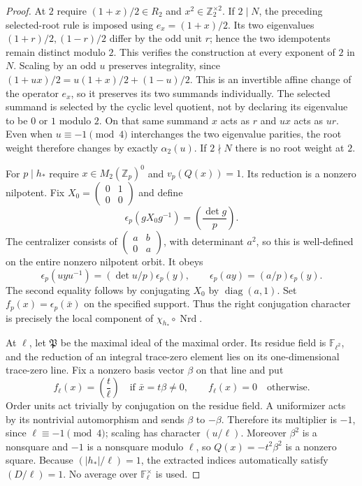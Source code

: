 \begin{proof}
At $2$ require $(1+x)/2\in R_2$ and $x^2\in\mathbb Z_2^{\times2}$.
If $2\mid N$, the preceding selected-root rule is imposed using
$e_x=(1+x)/2$.  Its two eigenvalues $(1+r)/2,(1-r)/2$ differ by the
odd unit $r$; hence the two idempotents remain distinct modulo $2$.
This verifies the construction at every exponent of $2$ in $N$.
Scaling by an odd $u$ preserves integrality, since
$(1+ux)/2=u(1+x)/2+(1-u)/2$.  This is an invertible affine change of
the operator $e_x$, so it preserves its two summands individually.
The selected summand is selected by the cyclic level quotient, not
by declaring its eigenvalue to be $0$ or $1$ modulo $2$.  On that same
summand $x$ acts as $r$ and $ux$ acts as $ur$.  Even when
$u\equiv-1\pmod4$ interchanges the two eigenvalue parities, the root
weight therefore changes by exactly $\alpha_2(u)$.
If $2\nmid N$ there is no root weight at $2$.

For $p\mid h_*$ require $x\in M_2(\mathbb Z_p)^0$ and
$v_p(Q(x))=1$.  Its reduction is a nonzero nilpotent.  Fix
$X_0=\left(\begin{smallmatrix}0&1\\0&0\end{smallmatrix}\right)$ and
define
\[
 \epsilon_p(gX_0g^{-1})=\left(\frac{\det g}{p}\right).
\]
The centralizer consists of
$\left(\begin{smallmatrix}a&b\\0&a\end{smallmatrix}\right)$, with
determinant $a^2$, so this is well-defined on the entire nonzero
nilpotent orbit.  It obeys
\[
 \epsilon_p(uyu^{-1})=(\det u/p)\epsilon_p(y),\qquad
 \epsilon_p(ay)=(a/p)\epsilon_p(y).
\]
The second equality follows by conjugating $X_0$ by
$\operatorname{diag}(a,1)$.  Set $f_p(x)=\epsilon_p(\bar x)$ on the
specified support.  Thus the right conjugation character is precisely
the local component of $\chi_{h_*}\circ\operatorname{Nrd}$.

At $\ell$, let $\mathfrak P$ be the maximal ideal of the maximal
order.  Its residue field is $\mathbb F_{\ell^2}$, and the reduction of
an integral trace-zero element lies on its one-dimensional trace-zero
line.  Fix a nonzero basis vector $\beta$ on that line and put
\[
 f_\ell(x)=\left(\frac{t}{\ell}\right)
   \quad\text{if }\bar x=t\beta\neq0,
 \qquad f_\ell(x)=0\quad\text{otherwise}.
\]
Order units act trivially by conjugation on the residue field.
A uniformizer acts by its nontrivial automorphism and sends
$\beta$ to $-\beta$.  Therefore its multiplier is $-1$, since
$\ell\equiv-1\pmod4$; scaling has character $(u/\ell)$.
Moreover $\beta^2$ is a nonsquare and $-1$ is a nonsquare modulo
$\ell$, so $Q(x)=-t^2\beta^2$ is a nonzero square.  Because
$(|h_*|/\ell)=1$, the extracted indices automatically satisfy
$(D/\ell)=1$.  No average over $\mathbb F_\ell^\times$ is used.


\end{proof}
